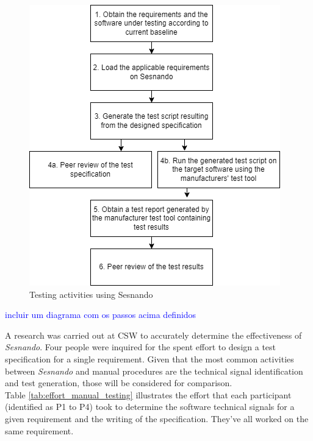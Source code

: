 \begin{figure}[p]
    \centering
    \includegraphics[scale=0.9]{images/sesnando_methods.png}
    \caption{Testing activities using Sesnando}
    \label{fig:sesnando_method}
\end{figure}

\textcolor{blue}{incluir um diagrama com os passos acima definidos}

A research was carried out at CSW to accurately determine the effectiveness of \textit{Sesnando}. Four people were inquired for the spent effort to design a test specification for a single requirement. Given that the most common activities between \textit{Sesnando} and manual procedures are the technical signal identification and test generation, those will be considered for comparison.\\

Table \ref{tab:effort_manual_testing} illustrates the effort that each participant (identified as P1 to P4) took to determine the software technical signals for a given requirement and the writing of the specification. They've all worked on the same requirement.

